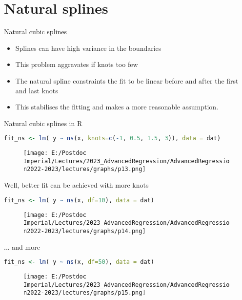 \documentclass{beamer}
\begin{document}
\section{Natural splines}
\begin{frame}[fragile]{Natural cubic splines}
	\begin{itemize}
		\item Splines can have high variance in the boundaries
		\item This problem aggravates if knots too few
		\item The natural spline constraints the fit to be linear before and after the first and last knots
		\item This stabilises the fitting and makes a more reasonable assumption.
	\end{itemize}
\end{frame}


\begin{frame}[fragile]{Natural cubic splines in R}
	\begin{lstlisting}[language=R, basicstyle=\scriptsize]
fit_ns <- lm( y ~ ns(x, knots=c(-1, 0.5, 1.5, 3)), data = dat)
	\end{lstlisting}
	\begin{figure}
	\centering	
	\texttt{[image: E:/Postdoc Imperial/Lectures/2023\_AdvancedRegression/AdvancedRegression2022-2023/lectures/graphs/p13.png]}	
	\end{figure}
\end{frame}


\begin{frame}[fragile]{Well, better fit can be achieved with more knots}
	\begin{lstlisting}[language=R, basicstyle=\scriptsize]
	fit_ns <- lm( y ~ ns(x, df=10), data = dat)
	\end{lstlisting}
	\begin{figure}
		\centering	
		\texttt{[image: E:/Postdoc Imperial/Lectures/2023\_AdvancedRegression/AdvancedRegression2022-2023/lectures/graphs/p14.png]}	
	\end{figure}
\end{frame}


\begin{frame}[fragile]{... and more}
	\begin{lstlisting}[language=R, basicstyle=\scriptsize]
	fit_ns <- lm( y ~ ns(x, df=50), data = dat)
	\end{lstlisting}
	\begin{figure}
		\centering	
		\texttt{[image: E:/Postdoc Imperial/Lectures/2023\_AdvancedRegression/AdvancedRegression2022-2023/lectures/graphs/p15.png]}	
	\end{figure}
\end{frame}
\end{document}
